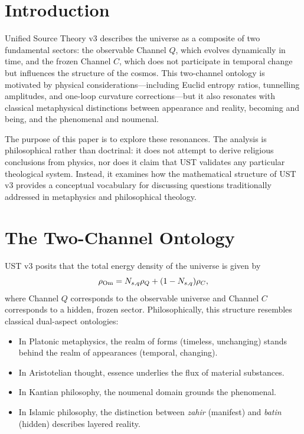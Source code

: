 \documentclass[12pt]{article}
\begin{document}
\section{Introduction}

Unified Source Theory v3 describes the universe as a composite of two
fundamental sectors: the observable Channel $Q$, which evolves dynamically in
time, and the frozen Channel $C$, which does not participate in temporal
change but influences the structure of the cosmos. This two-channel ontology
is motivated by physical considerations---including Euclid entropy ratios,
tunnelling amplitudes, and one-loop curvature corrections---but it also
resonates with classical metaphysical distinctions between appearance and
reality, becoming and being, and the phenomenal and noumenal.

The purpose of this paper is to explore these resonances. The analysis is
philosophical rather than doctrinal: it does not attempt to derive religious
conclusions from physics, nor does it claim that UST validates any particular
theological system. Instead, it examines how the mathematical structure of
UST v3 provides a conceptual vocabulary for discussing questions traditionally
addressed in metaphysics and philosophical theology.


\section{The Two-Channel Ontology}

UST v3 posits that the total energy density of the universe is given by
\[
\rho_{\rm Om} = N_{s,q}\rho_Q + (1-N_{s,q})\rho_C,
\]
where Channel $Q$ corresponds to the observable universe and Channel $C$
corresponds to a hidden, frozen sector. Philosophically, this structure
resembles classical dual-aspect ontologies:

\begin{itemize}
\item In Platonic metaphysics, the realm of forms (timeless, unchanging)
stands behind the realm of appearances (temporal, changing).
\item In Aristotelian thought, essence underlies the flux of material
substances.
\item In Kantian philosophy, the noumenal domain grounds the phenomenal.
\item In Islamic philosophy, the distinction between \emph{zahir} (manifest)
and \emph{batin} (hidden) describes layered reality.
\end{itemize}
\end{document}
